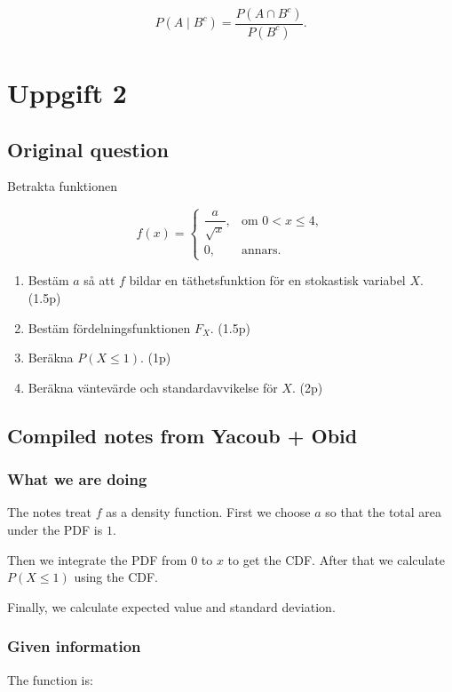 \documentclass[10pt]{article}
\begin{document}
\[
P(A\mid B^c)
=
\frac{P(A\cap B^c)}{P(B^c)}.
\]

\section*{Uppgift 2}

\subsection*{Original question}
Betrakta funktionen

\[
f(x)=
\begin{cases}
\dfrac{a}{\sqrt{x}},
& \text{om } 0<x\leq 4,\\
0,
& \text{annars.}
\end{cases}
\]

\begin{enumerate}[label=\alph*)]
\item
Bestäm $a$ så att $f$ bildar en täthetsfunktion för en stokastisk
variabel $X$.
\hfill (1.5p)

\item
Bestäm fördelningsfunktionen $F_X$.
\hfill (1.5p)

\item
Beräkna $P(X\leq 1)$.
\hfill (1p)

\item
Beräkna väntevärde och standardavvikelse för $X$.
\hfill (2p)
\end{enumerate}

\subsection*{Compiled notes from Yacoub + Obid}

\subsubsection*{What we are doing}
The notes treat $f$ as a density function.
First we choose $a$ so that the total area under the PDF is $1$.

Then we integrate the PDF from $0$ to $x$ to get the CDF.
After that we calculate $P(X\leq 1)$ using the CDF.

Finally, we calculate expected value and standard deviation.

\subsubsection*{Given information}
The function is:
\end{document}
